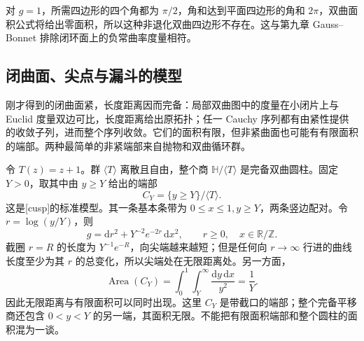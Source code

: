 对 \(g=1\)，所需四边形的四个角都为 \(\pi/2\)，角和达到平面四边形的角和 \(2\pi\)，双曲面积公式将给出零面积，所以这种非退化双曲四边形不存在。这与第九章 Gauss--Bonnet 排除闭环面上的负常曲率度量相符。

\subsection{闭曲面、尖点与漏斗的模型}
\label{g1:subsec:1002:04}

刚才得到的闭曲面紧，长度距离因而完备：局部双曲图中的度量在小闭片上与 Euclid 度量双边可比，长度距离给出原拓扑；任一 Cauchy 序列都有由紧性提供的收敛子列，进而整个序列收敛。它们的面积有限，但非紧曲面也可能有有限面积的端部。两种最简单的非紧端部来自抛物和双曲循环群。

\begin{example}\label{g1:exm:hyperbolic-cusp}
	令 \(T(z)=z+1\)。群 \(\langle T\rangle\) 离散且自由，整个商 \(\mathbb H/\langle T\rangle\) 是完备双曲圆柱。固定 \(Y>0\)，取其中由 \(y\ge Y\) 给出的端部
	\[
		C_Y=\{y\ge Y\}/\langle T\rangle.
	\]
	这是[cusp]的标准模型。其一条基本条带为 \(0\le x\le1,y\ge Y\)，两条竖边配对。令 \(r=\log(y/Y)\)，则
	\begin{equation}\label{g1:eq:hyperbolic-cusp-metric}
		g=\mathrm{d}r^2+Y^{-2}e^{-2r}\,\mathrm{d}x^2,
		\qquad r\ge0,\quad x\in\mathbb R/\mathbb Z.
	\end{equation}
	截圈 \(r=R\) 的长度为 \(Y^{-1}e^{-R}\)，向尖端越来越短；但是任何向 \(r\to\infty\) 行进的曲线长度至少为其 \(r\) 的总变化，所以尖端处在无限距离处。另一方面，
	\[
		\operatorname{Area}(C_Y)=\int_0^1\int_Y^\infty\frac{\mathrm{d}y\,\mathrm{d}x}{y^2}=\frac1Y.
	\]
	因此无限距离与有限面积可以同时出现。这里 \(C_Y\) 是带截口的端部；整个完备平移商还包含 \(0<y<Y\) 的另一端，其面积无限。不能把有限面积端部和整个圆柱的面积混为一谈。
\end{example}

